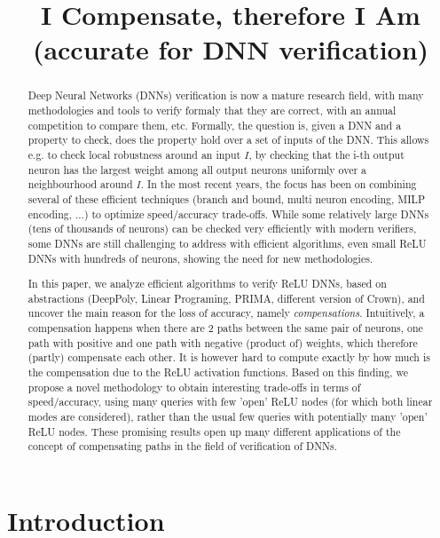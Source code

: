 \documentclass{llncs}
\title{I Compensate, therefore I Am \\ (accurate for DNN verification)}
\date{}
\begin{document}
\maketitle

\begin{abstract}
  Deep Neural Networks (DNNs) verification is now a mature research field, with many methodologies and tools to verify formaly  that they are correct, with an annual competition to compare them, etc. Formally, the question is, given a DNN and a property to check, does the property hold over a set of inputs of the DNN. This allows e.g. to check local robustness around an input $I$, by checking that the i-th output neuron has the largest weight among all output neurons uniformly over a neighbourhood around $I$.
  In the most recent years, the focus has been on combining several of these efficient techniques (branch and bound, multi neuron encoding, MILP encoding, ...) to optimize speed/accuracy trade-offs. While some relatively large DNNs (tens of thousands of neurons) can be checked very efficiently with modern verifiers, some DNNs are still challenging to address with efficient algorithms, even small ReLU DNNs with hundreds of neurons, showing the need for new methodologies.

  In this paper, we analyze efficient algorithms to verify ReLU DNNs, based on abstractions (DeepPoly, Linear Programing, PRIMA, different version of Crown), and uncover the main reason for the loss of accuracy, namely {\em compensations}. Intuitively, a compensation happens when there are 2 paths between the same pair of neurons, one path with positive and one path with negative (product of) weights, which therefore (partly) compensate each other. It is however hard to compute exactly by how much is the compensation due to the ReLU activation functions. Based on this finding, we propose a novel methodology to obtain interesting trade-offs in terms of speed/accuracy, using many queries with few 'open' ReLU nodes (for which both linear modes are considered), rather than the usual few queries with potentially many 'open' ReLU nodes. These promising results open up many different applications of the concept of compensating paths in the field of verification of DNNs.
\end{abstract}


\section{Introduction}


\end{document}
